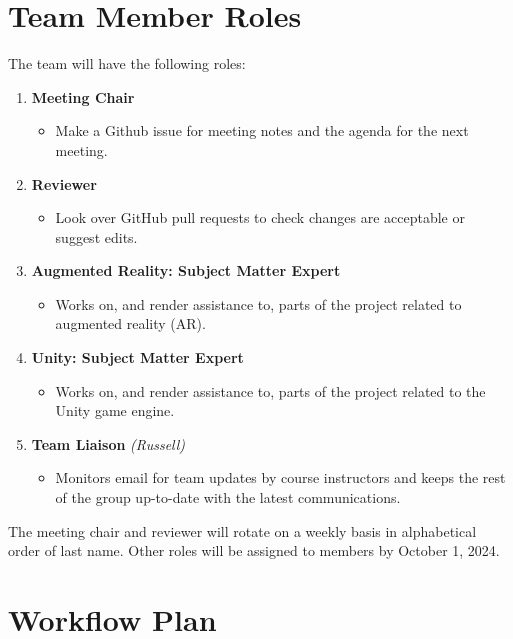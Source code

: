 \documentclass{article}
\begin{document}
\section{Team Member Roles} \label{team_member_roles}

The team will have the following roles:
\begin{enumerate}
    \item \textbf{Meeting Chair}
    \begin{itemize}
        \item Make a Github issue for meeting notes and the agenda for the next meeting.
    \end{itemize}
    \item \textbf{Reviewer}
    \begin{itemize}
        \item Look over GitHub pull requests to check changes are acceptable or suggest edits.
    \end{itemize}
    \item \textbf{Augmented Reality: Subject Matter Expert}
    \begin{itemize}
        \item Works on, and render assistance to, parts of the project related to augmented reality (AR).
    \end{itemize}
    \item \textbf{Unity: Subject Matter Expert}
    \begin{itemize}
        \item Works on, and render assistance to, parts of the project related to the Unity game engine.
    \end{itemize}
    \item \textbf{Team Liaison} \textit{(Russell)}
    \begin{itemize}
        \item Monitors email for team updates by course instructors and keeps the rest of the group up-to-date with the latest communications.
    \end{itemize}
\end{enumerate}

The meeting chair and reviewer will rotate on a weekly basis in alphabetical order of last name. Other roles will be assigned to members by October 1, 2024.

\section{Workflow Plan} \label{workflow_plan}
\end{document}
